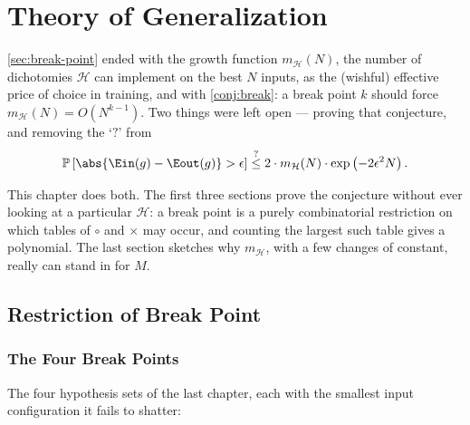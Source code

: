 \chapter{Theory of Generalization}

\begin{prev}
    \autoref{sec:break-point} ended with the growth function
    \(m_{\mathcal{H}}(N)\), the number of dichotomies \(\mathcal{H}\) can
    implement on the best \(N\) inputs, as the (wishful) effective price of
    choice in training, and with \autoref{conj:break}: a break point \(k\)
    should force \(m_{\mathcal{H}}(N) = O(N^{k-1})\). Two things were left
    open --- proving that conjecture, and removing the `\(?\)' from
    \[
        \mathbb{P}\left[ \abs{\Ein(g) - \Eout(g)} > \epsilon \right]
        \overset{?}{\le} 2 \cdot m_{\mathcal{H}}(N) \cdot
        \exp \left( -2 \epsilon^2 N \right) .
    \]
\end{prev}

This chapter does both. The first three sections prove the conjecture without
ever looking at a particular \(\mathcal{H}\): a break point is a purely
combinatorial restriction on which tables of \(\circ\) and \(\times\) may occur,
and counting the largest such table gives a polynomial. The last section
sketches why \(m_{\mathcal{H}}\), with a few changes of constant, really can
stand in for \(M\).

\section{Restriction of Break Point}\label{sec:restriction}


\subsection{The Four Break Points}

The four hypothesis sets of the last chapter, each with the smallest input
configuration it fails to shatter:

